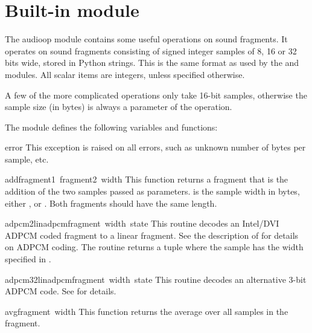 \section{Built-in module }

The audioop module contains some useful operations on sound fragments.
It operates on sound fragments consisting of signed integer samples of
8, 16 or 32 bits wide, stored in Python strings.  This is the same
format as used by the  and  modules.  All
scalar items are integers, unless specified otherwise.

A few of the more complicated operations only take 16-bit samples,
otherwise the sample size (in bytes) is always a parameter of the operation.

The module defines the following variables and functions:

\renewcommand{\indexsubitem}{(in module audioop)}
\begin{excdesc}{error}
This exception is raised on all errors, such as unknown number of bytes
per sample, etc.
\end{excdesc}

\begin{funcdesc}{add}{fragment1\, fragment2\, width}
This function returns a fragment that is the addition of the two samples
passed as parameters.  is the sample width in bytes, either
,  or . Both fragments should have the same length.
\end{funcdesc}

\begin{funcdesc}{adpcm2lin}{adpcmfragment\, width\, state}
This routine decodes an Intel/DVI ADPCM coded fragment to a linear
fragment. See the description of  for details on ADPCM
coding. The routine returns a tuple
where the sample has the width specified in .
\end{funcdesc}

\begin{funcdesc}{adpcm32lin}{adpcmfragment\, width\, state}
This routine decodes an alternative 3-bit ADPCM code. See
 for details.
\end{funcdesc}

\begin{funcdesc}{avg}{fragment\, width}
This function returns the average over all samples in the fragment.
\end{funcdesc}

